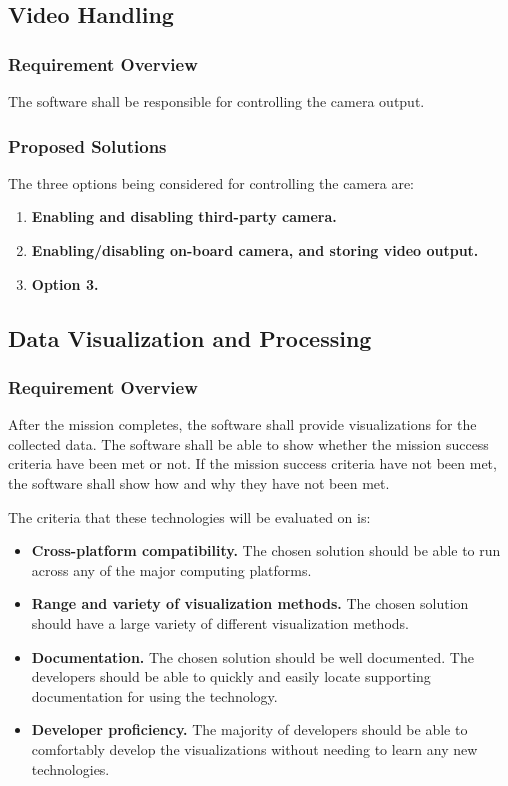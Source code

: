 \documentclass[letterpaper,10pt]{article}
\begin{document}
\subsection{Video Handling}
\subsubsection{Requirement Overview}
The software shall be responsible for controlling the camera output.
\subsubsection{Proposed Solutions}
The three options being considered for controlling the camera are:
\begin{enumerate}
\item{
\textbf{Enabling and disabling third-party camera.}
}

\item{
\textbf{Enabling/disabling on-board camera, and storing video output.}
}

\item{
\textbf{Option 3.}
}
\end{enumerate}

\subsection{Data Visualization and Processing}
\subsubsection{Requirement Overview}
After the mission completes, the software shall provide visualizations for the collected data.
The software shall be able to show whether the mission success criteria have been met or not.
If the mission success criteria have not been met, the software shall show how and
why they have not been met.

The criteria that these technologies will be evaluated on is:
\begin{itemize}
\item \textbf{Cross-platform compatibility.}
The chosen solution should be able to run across any of the major computing platforms.

\item \textbf{Range and variety of visualization methods.}
The chosen solution should have a large variety of different visualization methods.

\item \textbf{Documentation.}
The chosen solution should be well documented.
The developers should be able to quickly and easily locate supporting documentation for using the technology.

\item \textbf{Developer proficiency.}
The majority of developers should be able to comfortably develop the visualizations
without needing to learn any new technologies.
\end{itemize}
\end{document}
